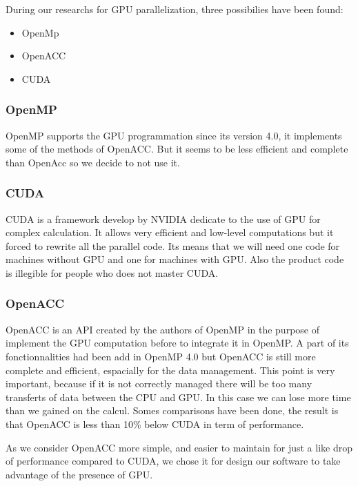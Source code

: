 During our researchs for GPU parallelization, three possibilies have been found:
\begin{itemize}
\item OpenMp
\item OpenACC
\item CUDA
\end{itemize}


\subsubsection{OpenMP}
OpenMP supports the GPU programmation since its version 4.0, it implements some of the methods of OpenACC. But it seems to be less efficient and complete than OpenAcc so we decide to not use it.

\subsubsection{CUDA}
CUDA is a framework develop by NVIDIA dedicate to the use of GPU for complex calculation. It allows very efficient and low-level computations but it forced to rewrite all the parallel code. Its means that we will need one code for machines without GPU and one for machines with GPU. Also the product code is illegible for people who does not master CUDA.

\subsubsection{OpenACC}
OpenACC is an API created by the authors of OpenMP in the purpose of implement the GPU computation before to integrate it in OpenMP. A part of its fonctionnalities had been add in OpenMP 4.0 but OpenACC is still more complete and efficient, espacially for the data management. This point is very important, because if it is not correctly managed there will be too many transferts of data between the CPU and GPU. In this case we can lose more time than we gained on the calcul. Somes comparisons have been done, the result is that OpenACC is less than 10\% below CUDA in term of performance. 

As we consider OpenACC more simple, and easier to maintain for just a like drop of performance compared to CUDA, we chose it for design our software to take advantage of the presence of GPU.